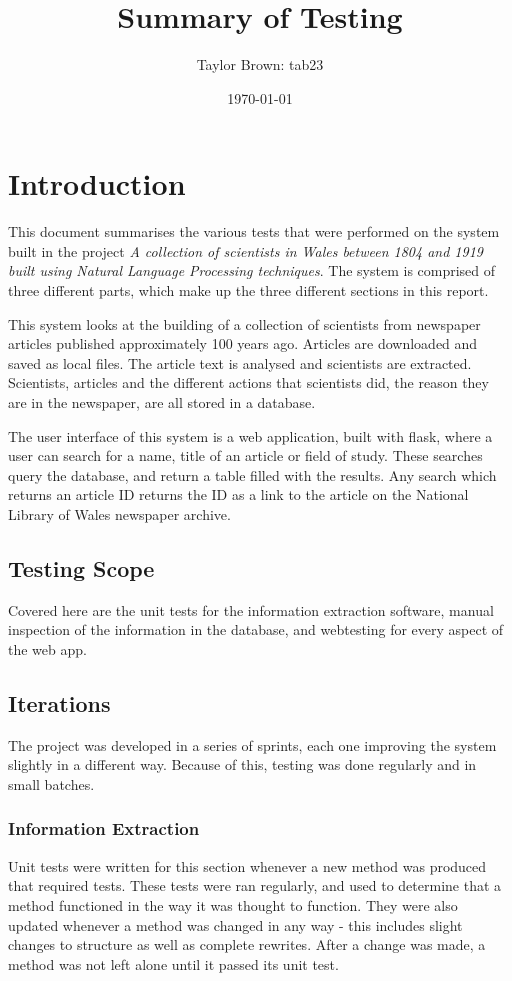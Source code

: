 \documentclass[11pt,a4paper]{article}
\title{Summary of Testing}
\author{Taylor Brown: tab23}
\date{\today}
\begin{document}
\maketitle
\section{Introduction}
This document summarises the various tests that were performed on the system built in the project \textit{A collection of scientists in Wales between 1804 and 1919 built using Natural Language Processing techniques}. The system is comprised of three different parts, which make up the three different sections in this report. 

This system looks at the building of a collection of scientists from newspaper articles published approximately 100 years ago. Articles are downloaded and saved as local files. The article text is analysed and scientists are extracted. Scientists, articles and the different actions that scientists did, the reason they are in the newspaper, are all stored in a database. 

The user interface of this system is a web application, built with flask, where a user can search for a name, title of an article or field of study. These searches query the database, and return a table filled with the results. Any search which returns an article ID returns the ID as a link to the article on the National Library of Wales newspaper archive.

\subsection{Testing Scope}
Covered here are the unit tests for the information extraction software, manual inspection of the information in the database, and webtesting for every aspect of the web app. 

\subsection{Iterations}
The project was developed in a series of sprints, each one improving the system slightly in a different way. Because of this, testing was done regularly and in small batches. 

\subsubsection{Information Extraction}
Unit tests were written for this section whenever a new method was produced that required tests. These tests were ran regularly, and used to determine that a method functioned in the way it was thought to function. They were also updated whenever a method was changed in any way - this includes slight changes to structure as well as complete rewrites. After a change was made, a method was not left alone until it passed its unit test. 
\end{document}
